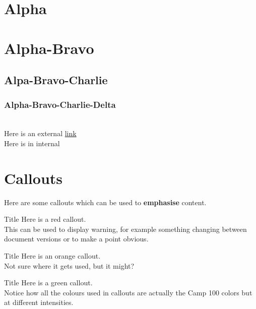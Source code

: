 \documentclass[a4paper, 11pt]{article}
\begin{document}
\makedocumenttitlepage


\section{Alpha}
\lipsum[1]
\section{Alpha-Bravo}
\subsection{Alpa-Bravo-Charlie}
\subsubsection{Alpha-Bravo-Charlie-Delta}
\lipsum[1-3]\\

Here is an external \href{https://camp100.org.uk}{link}\\

Here is in internal 

\section{Callouts}
Here are some callouts which can be used to \textbf{emphasise} content.

\begin{callout-red}{Title}
Here is a red callout.\\

This can be used to display warning, for example something changing between document versions or to make a point obvious.
\end{callout-red}

\begin{callout-orange}{Title}
Here is an orange callout.\\

Not sure where it gets used, but it might?
\end{callout-orange}

\begin{callout-green}{Title}
Here is a green callout.\\

Notice how all the colours used in callouts are actually the Camp 100 colors but at different intensities. 
\end{callout-green}
\end{document}
